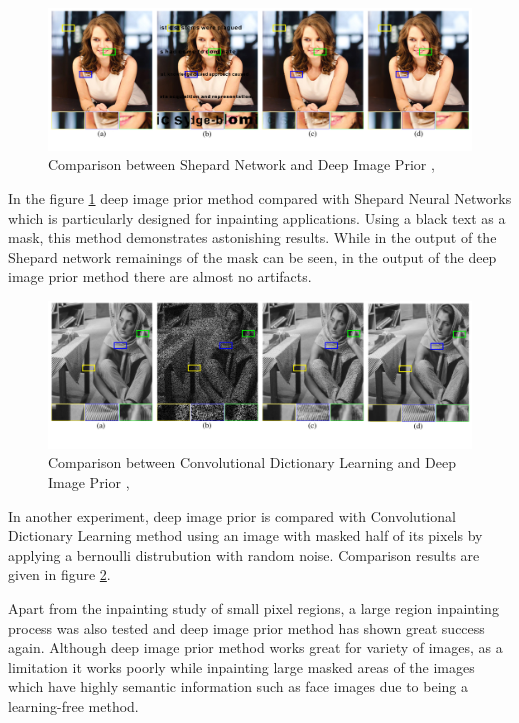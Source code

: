 \begin{figure}[h]
    \centering
    \includegraphics[width=13cm]{figures/chapter4/imprior1.png}
    \caption{Comparison between Shepard Network and Deep Image Prior \cite{shepard_nn}, \cite{deep_image_prior}}
    \label{fig:prior_shepard_comparison}
\end{figure}

In the figure \ref{fig:prior_shepard_comparison} deep image prior method compared with Shepard Neural Networks \cite{shepard_nn} which is particularly designed for inpainting applications. Using a black text as a mask, this method demonstrates astonishing results. While in the output of the Shepard network remainings of the mask can be seen, in the output of the deep image prior method there are almost no artifacts.

\begin{figure}[h]
    \centering
    \includegraphics[width=13cm]{figures/chapter4/imprior2.png}
    \caption{Comparison between Convolutional Dictionary Learning and Deep Image Prior \cite{conv_dict_learning}, \cite{deep_image_prior}}
    \label{fig:prior_dict_camparison}
\end{figure}

In another experiment, deep image prior is compared with Convolutional Dictionary Learning method \cite{conv_dict_learning} using an image with masked half of its pixels by applying a bernoulli distrubution \cite{bernoulli} with random noise. Comparison results are given in figure \ref{fig:prior_dict_camparison}.

Apart from the inpainting study of small pixel regions, a large region inpainting process was also tested and deep image prior method has shown great success again. Although deep image prior method works great for variety of images, as a limitation it works poorly while inpainting large masked areas of the images which have highly semantic information such as face images due to being a learning-free method.

